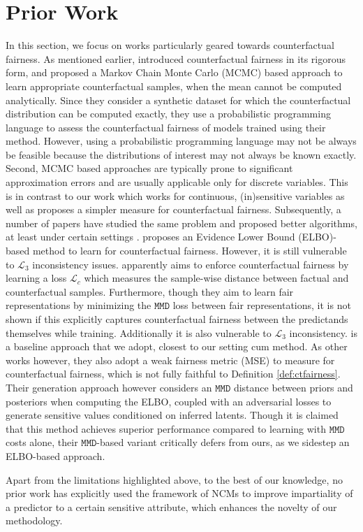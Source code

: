 \section{Prior Work}
\label{subsec:prior_work}
In this section, we focus on works particularly geared towards counterfactual fairness. As mentioned earlier, \cite{10.5555/3294996.3295162} introduced counterfactual fairness in its rigorous form, and proposed a Markov Chain Monte Carlo (MCMC) based approach to learn appropriate counterfactual samples, when the mean cannot be computed analytically. Since they consider a synthetic dataset for which the counterfactual distribution can be computed exactly, they use a probabilistic programming language to assess the counterfactual fairness of models trained using their method. However, using a probabilistic programming language may not be always be feasible because the distributions of interest may not always be known exactly. Second, MCMC based approaches are typically prone to significant approximation errors and are usually applicable only for discrete variables. This is in contrast to our work which works for continuous, (in)sensitive variables as well as proposes a simpler measure for counterfactual fairness. Subsequently, a number of papers have studied the same problem and proposed better algorithms, at least under certain settings \cite{10.24963/ijcai.2024/504,10.1145/3580305.3599408,10.1007/s10994-022-06206-8,zuo2022counterfactual,10.5555/3367032.3367236}.
\cite{10.24963/ijcai.2024/504} proposes an Evidence Lower Bound (ELBO)-based method to learn for counterfactual fairness. However, it is still vulnerable to $\mathcal{L}_3$ inconsistency issues. \cite{10.1145/3580305.3599408} apparently aims to enforce counterfactual fairness by learning a loss $\mathcal{L}_c$ which measures the sample-wise distance between factual and counterfactual samples. Furthermore, though they aim to learn fair representations by minimizing the $\texttt{MMD}$ loss between fair representations, it is not shown if this explicitly captures counterfactual fairness between the predictands themselves while training. Additionally it is also vulnerable to $\mathcal{L}_3$ inconsistency. \cite{10.1007/s10994-022-06206-8} is a baseline approach that we adopt, closest to our setting cum method. As other works however, they also adopt a weak fairness metric (MSE) to measure for counterfactual fairness, which is not fully faithful to Definition \ref{def:ctfairness}. Their generation approach however considers an $\texttt{MMD}$ distance between priors and posteriors when computing the ELBO, coupled with an adversarial losses to generate sensitive values conditioned on inferred latents. Though it is claimed that this method achieves superior performance compared to learning with $\texttt{MMD}$ costs alone, their $\texttt{MMD}$-based variant critically defers from ours, as we sidestep an ELBO-based approach. 

Apart from the limitations highlighted above, to the best of our knowledge, no prior work has explicitly used the framework of NCMs to improve impartiality of a predictor to a certain sensitive attribute, which enhances the novelty of our methodology.